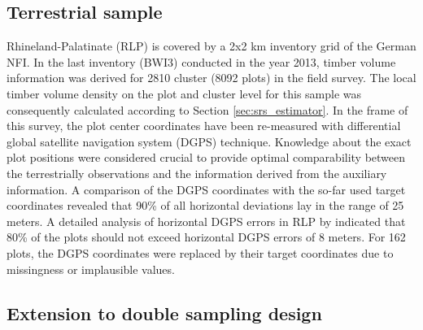 

\subsection{Terrestrial sample}

Rhineland-Palatinate (RLP) is covered by a 2x2 km inventory grid of the German NFI. In the last inventory (BWI3) conducted in the year 2013, timber volume information was derived for 2810 cluster (8092 plots) in the field survey. The local timber volume density on the plot and cluster level for this sample was consequently calculated according to Section \ref{sec:srs_estimator}. In the frame of this survey, the plot center coordinates have been re-measured with differential global satellite navigation system (DGPS) technique. Knowledge about the exact plot positions were considered crucial to provide optimal comparability between the terrestrially observations and the information derived from the auxiliary information. A comparison of the DGPS coordinates with the so-far used target coordinates revealed that 90\% of all horizontal deviations lay in the range of 25 meters. A detailed analysis of horizontal DGPS errors in RLP by \citet{lambrecht2017} indicated that 80\% of the plots should not exceed horizontal DGPS errors of 8 meters. For 162 plots, the DGPS coordinates were replaced by their target coordinates due to missingness or implausible values.

%


\subsection{Extension to double sampling design}

